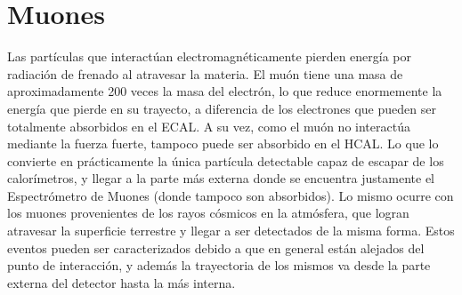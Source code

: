 \begin{table} 
\centering
\caption{Definición de algunos de los WPs de aislamiento para fotones y electrones. En particular los mostrados se definen a partir de cortes fijos en las variables (\textit{fixed cuts}).}

\label{tab:IDWPs}
\end{table}








\section{Muones}


Las partículas que interactúan electromagnéticamente pierden energía por radiación de frenado al atravesar la materia. El muón tiene una masa de aproximadamente 200 veces la masa del electrón, lo que reduce enormemente la energía que pierde en su trayecto, a diferencia de los electrones que pueden ser totalmente absorbidos en el ECAL. A su vez, como el muón no interactúa mediante la fuerza fuerte, tampoco puede ser absorbido en el HCAL. Lo que lo convierte en prácticamente la única partícula detectable capaz de escapar de los calorímetros, y llegar a la parte más externa donde se encuentra justamente el Espectrómetro de Muones (donde tampoco son absorbidos). Lo mismo ocurre con los muones provenientes de los rayos cósmicos en la atmósfera, que logran atravesar la superficie terrestre y llegar a ser detectados de la misma forma. Estos eventos pueden ser caracterizados debido a que en general están alejados del punto de interacción, y además la trayectoria de los mismos va desde la parte externa del detector hasta la más interna.


